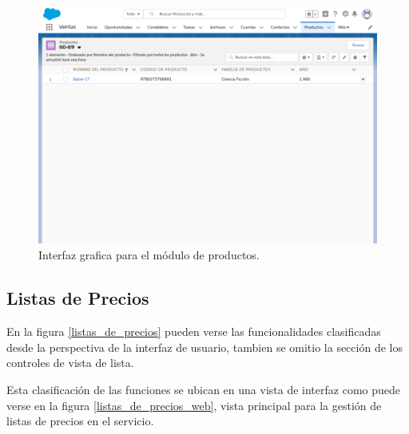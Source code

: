 \begin{figure}
\centering
\includegraphics[width=1.0\textwidth]{graphics/productos.eps}
\caption{Interfaz grafica para el módulo de productos.}
\label{productos_web}
\end{figure}

\subsection{Listas de Precios}
En la figura \ref{listas_de_precios} pueden verse las funcionalidades
clasificadas desde la perspectiva de la interfaz de usuario, tambien se omitio
la sección de los controles de vista de lista.

Esta clasificación de las funciones se ubican en una vista de interfaz como
puede verse en la figura \ref{listas_de_precios_web}, vista principal para la
gestión de listas de precios en el servicio.

